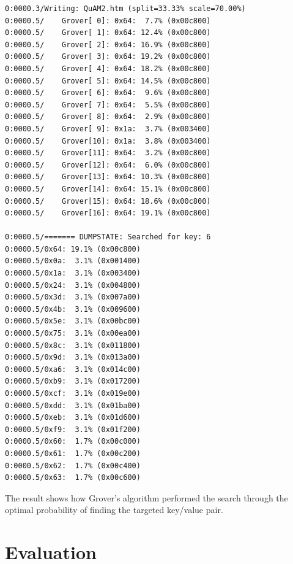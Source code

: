 \documentclass[12pt]{third-rep}
\begin{document}
\begin{verbatim}
0:0000.3/Writing: QuAM2.htm (split=33.33% scale=70.00%)
0:0000.5/    Grover[ 0]: 0x64:  7.7% (0x00c800)
0:0000.5/    Grover[ 1]: 0x64: 12.4% (0x00c800)
0:0000.5/    Grover[ 2]: 0x64: 16.9% (0x00c800)
0:0000.5/    Grover[ 3]: 0x64: 19.2% (0x00c800)
0:0000.5/    Grover[ 4]: 0x64: 18.2% (0x00c800)
0:0000.5/    Grover[ 5]: 0x64: 14.5% (0x00c800)
0:0000.5/    Grover[ 6]: 0x64:  9.6% (0x00c800)
0:0000.5/    Grover[ 7]: 0x64:  5.5% (0x00c800)
0:0000.5/    Grover[ 8]: 0x64:  2.9% (0x00c800)
0:0000.5/    Grover[ 9]: 0x1a:  3.7% (0x003400)
0:0000.5/    Grover[10]: 0x1a:  3.8% (0x003400)
0:0000.5/    Grover[11]: 0x64:  3.2% (0x00c800)
0:0000.5/    Grover[12]: 0x64:  6.0% (0x00c800)
0:0000.5/    Grover[13]: 0x64: 10.3% (0x00c800)
0:0000.5/    Grover[14]: 0x64: 15.1% (0x00c800)
0:0000.5/    Grover[15]: 0x64: 18.6% (0x00c800)
0:0000.5/    Grover[16]: 0x64: 19.1% (0x00c800)

0:0000.5/======= DUMPSTATE: Searched for key: 6
0:0000.5/0x64: 19.1% (0x00c800)
0:0000.5/0x0a:  3.1% (0x001400)
0:0000.5/0x1a:  3.1% (0x003400)
0:0000.5/0x24:  3.1% (0x004800)
0:0000.5/0x3d:  3.1% (0x007a00)
0:0000.5/0x4b:  3.1% (0x009600)
0:0000.5/0x5e:  3.1% (0x00bc00)
0:0000.5/0x75:  3.1% (0x00ea00)
0:0000.5/0x8c:  3.1% (0x011800)
0:0000.5/0x9d:  3.1% (0x013a00)
0:0000.5/0xa6:  3.1% (0x014c00)
0:0000.5/0xb9:  3.1% (0x017200)
0:0000.5/0xcf:  3.1% (0x019e00)
0:0000.5/0xdd:  3.1% (0x01ba00)
0:0000.5/0xeb:  3.1% (0x01d600)
0:0000.5/0xf9:  3.1% (0x01f200)
0:0000.5/0x60:  1.7% (0x00c000)
0:0000.5/0x61:  1.7% (0x00c200)
0:0000.5/0x62:  1.7% (0x00c400)
0:0000.5/0x63:  1.7% (0x00c600)
\end{verbatim}
The result shows how Grover's algorithm performed the search through the optimal probability of finding the targeted key/value pair.

\begingroup
\renewcommand{\cleardoublepage}{}
\renewcommand{\clearpage}{}
\chapter{Evaluation}
\endgroup
\end{document}
